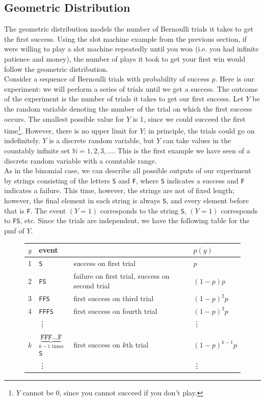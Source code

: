 \documentclass[12pt]{article}
\theoremstyle{definition}
\theoremstyle{remark}
\def\N{{\mathbb N}}
\begin{document}
\subsection{Geometric Distribution}

The geometric distribution models the number of Bernoulli trials it takes to get the first success. Using the slot machine example from the previous section, if were willing to play a slot machine repeatedly until you won (i.e. you had infinite patience and money), the number of plays it took to get your first win would follow the geometric distribution.\\

Consider a sequence of Bernoulli trials with probability of success $p$. Here is our experiment: we will perform a series of trials until we get a success. The outcome of the experiment is the number of trials it takes to get our first success. Let $Y$ be the random variable denoting the number of the trial on which the first success occurs.
The smallest possible value for $Y$ is 1, since we could succeed the first time\footnote{$Y$ cannot be 0, since you cannot succeed if you don't play.}. However, there is no upper limit for $Y$; in principle, the trials could go on indefinitely. $Y$ is a discrete random variable, but $Y$ can take values in the countably infinite set $\N = 1, 2, 3, \dots$. This is the first example we have seen of a discrete random variable with a countable range.\\

As in the binomial case, we can describe all possible outputs of our experiment by strings consisting of the letters \texttt{S} and \texttt{F}, where \texttt{S} indicates a success and \texttt{F} indicates a failure. This time, however, the strings are not of fixed length; however, the final element in each string is always \texttt{S}, and every element before that is \texttt{F}. The event $(Y = 1)$ corresponds to the string \texttt{S}, $(Y = 1)$ corresponds to \texttt{FS}, etc. Since the trials are independent, we have the following table for the pmf of $Y$.

\begin{figure}[H]
\centering
\begin{tabular}{llll}
\toprule
$y$ & event && $p(y)$\\
\midrule
1 & \texttt{S}     & success on first trial                          & $p$\\
2 & \texttt{FS}    & failure on first trial, success on second trial & $(1-p)p$\\
3 & \texttt{FFS}   & first success on third trial                    & $(1-p)^2 p$\\
4 & \texttt{FFFS}  & first success on fourth trial                   & $(1-p)^3 p$\\
& \vdots & & \vdots \\
$k$ & $\underbrace{ \texttt{FFF}\dots\texttt{F}}_{\text{$k - 1$ times}}$\texttt{S} & first success on $k$th trial & $(1-p)^{k-1} p$ \\
& \vdots & & \vdots \\
\bottomrule
\end{tabular}
\end{figure}
\end{document}
